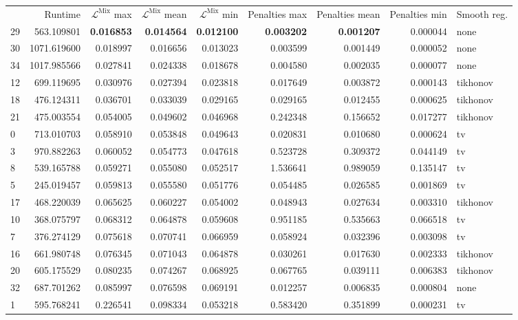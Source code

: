 \documentclass[nomenclature, english, bibtex]{kththesis}
\numberwithin{listing}{chapter}
\begin{document}
\begin{table}
\centering
\begin{tabularx}{\linewidth}{lrrrrrrrl}
 & Runtime & $\mathcal{L}^{\text{Mix}}$ max & $\mathcal{L}^{\text{Mix}}$ mean & $\mathcal{L}^{\text{Mix}}$ min & Penalties max & Penalties mean & Penalties min & Smooth reg. \\
 29 & 563.109801 & \bfseries 0.016853 & \bfseries 0.014564 & \bfseries 0.012100 & \bfseries 0.003202 & \bfseries 0.001207 & 0.000044 & none \\
 30 & 1071.619600 & 0.018997 & 0.016656 & 0.013023 & 0.003599 & 0.001449 & 0.000052 & none \\
 34 & 1017.985566 & 0.027841 & 0.024338 & 0.018678 & 0.004580 & 0.002035 & 0.000077 & none \\
 12 & 699.119695 & 0.030976 & 0.027394 & 0.023818 & 0.017649 & 0.003872 & 0.000143 & tikhonov \\
 18 & 476.124311 & 0.036701 & 0.033039 & 0.029165 & 0.029165 & 0.012455 & 0.000625 & tikhonov \\
 21 & 475.003554 & 0.054005 & 0.049602 & 0.046968 & 0.242348 & 0.156652 & 0.017277 & tikhonov \\
 0 & 713.010703 & 0.058910 & 0.053848 & 0.049643 & 0.020831 & 0.010680 & 0.000624 & tv \\
 3 & 970.882263 & 0.060052 & 0.054773 & 0.047618 & 0.523728 & 0.309372 & 0.044149 & tv \\
 8 & 539.165788 & 0.059271 & 0.055080 & 0.052517 & 1.536641 & 0.989059 & 0.135147 & tv \\
 5 & 245.019457 & 0.059813 & 0.055580 & 0.051776 & 0.054485 & 0.026585 & 0.001869 & tv \\
 17 & 468.220039 & 0.065625 & 0.060227 & 0.054002 & 0.048943 & 0.027634 & 0.003310 & tikhonov \\
 10 & 368.075797 & 0.068312 & 0.064878 & 0.059608 & 0.951185 & 0.535663 & 0.066518 & tv \\
 7 & 376.274129 & 0.075618 & 0.070741 & 0.066959 & 0.058924 & 0.032396 & 0.003098 & tv \\
 16 & 661.980748 & 0.076345 & 0.071043 & 0.064878 & 0.030261 & 0.017630 & 0.002333 & tikhonov \\
 20 & 605.175529 & 0.080235 & 0.074267 & 0.068925 & 0.067765 & 0.039111 & 0.006383 & tikhonov \\
 32 & 687.701262 & 0.085997 & 0.076598 & 0.069191 & 0.012257 & 0.006835 & 0.000804 & none \\
 1 & 595.768241 & 0.226541 & 0.098334 & 0.053218 & 0.583420 & 0.351899 & 0.000231 & tv \\

\end{tabularx}
\end{table}
\end{document}
